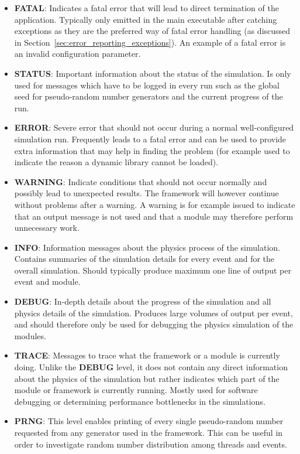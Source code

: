 \begin{itemize}
\item \textbf{FATAL}: Indicates a fatal error that will lead to direct termination of the application.
Typically only emitted in the main executable after catching exceptions as they are the preferred way of fatal error handling (as discussed in Section~\ref{sec:error_reporting_exceptions}).
An example of a fatal error is an invalid configuration parameter.
\item \textbf{STATUS}: Important information about the status of the simulation.
Is only used for messages which have to be logged in every run such as the global seed for pseudo-random number generators and the current progress of the run.
\item \textbf{ERROR}: Severe error that should not occur during a normal well-configured simulation run.
Frequently leads to a fatal error and can be used to provide extra information that may help in finding the problem (for example used to indicate the reason a dynamic library cannot be loaded).
\item \textbf{WARNING}: Indicate conditions that should not occur normally and possibly lead to unexpected results.
The framework will however continue without problems after a warning.
A warning is for example issued to indicate that an output message is not used and that a module may therefore perform unnecessary work.
\item \textbf{INFO}: Information messages about the physics process of the simulation.
Contains summaries of the simulation details for every event and for the overall simulation.
Should typically produce maximum one line of output per event and module.
\item \textbf{DEBUG}: In-depth details about the progress of the simulation and all physics details of the simulation.
Produces large volumes of output per event, and should therefore only be used for  debugging the physics simulation of the modules.
\item \textbf{TRACE}: Messages to trace what the framework or a module is currently doing.
Unlike the \textbf{DEBUG} level, it does not contain any direct information about the physics of the simulation but rather indicates which part of the module or framework is currently running.
Mostly used for software debugging or determining performance bottlenecks in the simulations.
\item \textbf{PRNG}: This level enables printing of every single pseudo-random number requested from any generator used in the framework. This can be useful in order to investigate random number distribution among threads and events.
\end{itemize}

